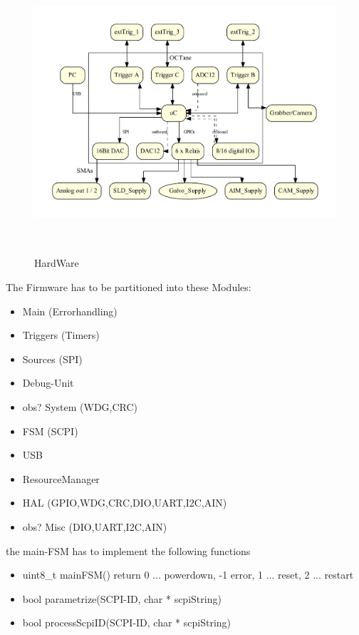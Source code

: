 		\begin{figure}[ht]
			\centering
			\includegraphics[height=105mm]{src/_Octane_HW-Structure.pdf}
			\caption{HardWare}
			\label{_Octane_HW-Structure.pdf}
		\end{figure}


	{ The Firmware has to be partitioned into these Modules:
		\begin{itemize}
		\item Main (Errorhandling)
		\item Triggers	(Timers)
		\item Sources	(SPI)
		\item Debug-Unit
		\item obs? System (WDG,CRC) 
		\item FSM (SCPI) 
		\item USB
		\item ResourceManager
		\item HAL (GPIO,WDG,CRC,DIO,UART,I2C,AIN)
		\item obs? Misc	(DIO,UART,I2C,AIN)
		\end{itemize}
	}

	{	the main-FSM has to implement the following functions
		\begin{itemize}
			\item 	uint8_t mainFSM() return 0 ... powerdown, -1 error, 1 ... reset, 2 ... restart
			\item 	bool parametrize(SCPI-ID, char * scpiString)
			\item 	bool processScpiID(SCPI-ID, char * scpiString)
		\end{itemize}
	}

